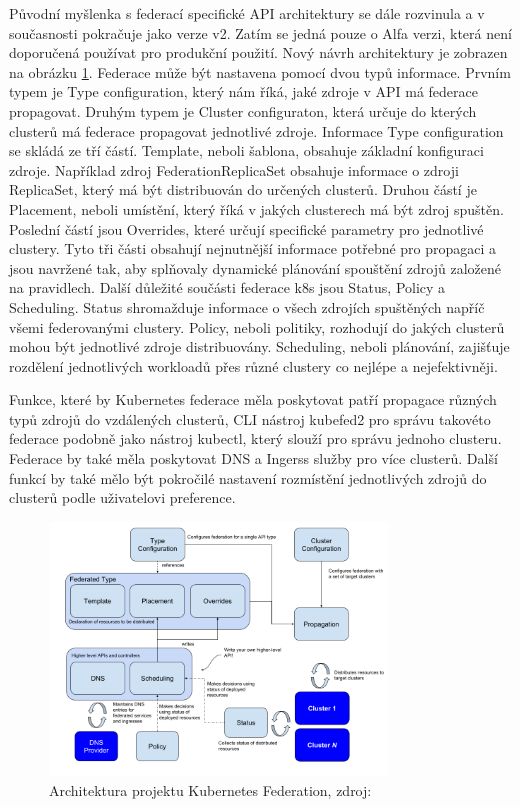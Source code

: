     Původní myšlenka s federací specifické API architektury se dále rozvinula a v současnosti pokračuje jako verze v2. Zatím se jedná pouze o Alfa verzi, která není doporučená používat pro produkční použití. Nový návrh architektury je zobrazen na obrázku \ref{fig:k8s-federated}. Federace může být nastavena pomocí dvou typů informace. Prvním typem je Type configuration, který nám říká, jaké zdroje v API má federace propagovat. Druhým typem je Cluster configuraton, která určuje do kterých clusterů má federace propagovat jednotlivé zdroje. Informace Type configuration se skládá ze tří částí. Template, neboli šablona, obsahuje základní konfiguraci zdroje. Například zdroj FederationReplicaSet obsahuje informace o zdroji ReplicaSet, který má být distribuován do určených clusterů. Druhou částí je Placement, neboli umístění, který říká v jakých clusterech má být zdroj spuštěn. Poslední částí jsou Overrides, které určují specifické parametry pro jednotlivé clustery. Tyto tři části obsahují nejnutnější informace potřebné pro propagaci a jsou navržené tak, aby splňovaly dynamické plánování spouštění zdrojů založené \linebreak na pravidlech. Další důležité součásti federace k8s jsou Status, Policy a Scheduling. Status shromažduje informace o všech zdrojích spuštěných napříč všemi federovanými clustery. Policy, neboli politiky, rozhodují do jakých clusterů mohou být jednotlivé zdroje distribuovány. Scheduling, neboli plánování, zajišťuje rozdělení jednotlivých workloadů přes různé clustery co nejlépe a nejefektivněji.\par 
        Funkce, které by Kubernetes federace měla poskytovat patří propagace různých typů zdrojů do vzdálených clusterů, CLI nástroj kubefed2 pro správu takovéto federace podobně jako nástroj kubectl, který slouží pro správu jednoho clusteru. Federace by také měla poskytovat DNS a Ingerss služby pro více clusterů. Další funkcí by také mělo být pokročilé nastavení rozmístění jednotlivých zdrojů do clusterů podle uživatelovi preference.


\begin{figure}[H]
  \begin{centering}
	  \includegraphics[width=0.8\textwidth]{images/k8s-federated.png}
    \par
	  \caption{Architektura projektu Kubernetes Federation\label{fig:k8s-federated}, zdroj: }
    \end{centering}
\end{figure}
	
